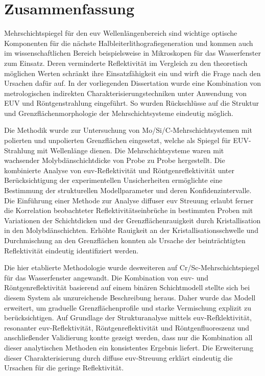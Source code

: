 \cleardoublepage

\thispagestyle{empty}

\section*{Zusammenfassung}

    Mehrschichtspiegel für den \gls{euv} Wellenlängenbereich sind wichtige optische Komponenten für die nächste Halbleiterlithografiegeneration und kommen auch im wissenschaftlichen Bereich beispielsweise in Mikroskopen für das Wasserfenster zum Einsatz. Deren verminderte Reflektivität im Vergleich zu den theoretisch möglichen Werten schränkt ihre Einsatzfähigkeit ein und wirft die Frage nach den Ursachen dafür auf. In der vorliegenden Dissertation wurde eine Kombination von metrologischen indirekten Charakterisierungstechniken unter Anwendung von EUV und Röntgenstrahlung eingeführt. So wurden Rückschlüsse auf die Struktur und Grenzflächenmorphologie der Mehrschichtsysteme eindeutig möglich.

    Die Methodik wurde zur Untersuchung von Mo/Si/C-Mehrschichtsystemen mit polierten und unpolierten Grenzflächen eingesetzt, welche als Spiegel für EUV-Strahlung mit  Wellenlänge dienen. Die Mehrschichtsysteme waren mit wachsender Molybdänschichtdicke von Probe zu Probe hergestellt. Die kombinierte Analyse von \gls{euv}-Reflektivität und Röntgenreflektivität unter Berücksichtigung der experimentellen Unsicherheiten ermöglichte eine Bestimmung der strukturellen Modellparameter und deren Konfidenzintervalle. Die Einführung einer Methode zur Analyse diffuser \gls{euv} Streuung erlaubt ferner die Korrelation beobachteter Reflektivitätseinbrüche in bestimmten Proben mit Variationen der Schichtdicken und der Grenzflächenrauigkeit durch Kristallisation in den Molybdänschichten. Erhöhte Rauigkeit an der Kristallisationsschwelle und Durchmischung an den Grenzflächen konnten als Ursache der beinträchtigten Reflektivität eindeutig identifiziert werden.

    Die hier etablierte Methodologie wurde desweiteren auf Cr/Sc-Mehrschichtspiegel für das Wasserfenster angewandt. Die Kombination von \gls{euv}- und Röntgenreflektivität basierend auf einem binären Schichtmodell stellte sich bei diesem System als unzureichende Beschreibung heraus. Daher wurde das Modell erweitert, um graduelle Grenzflächenprofile und starke Vermischung explizit zu berücksichtigen. Auf Grundlage der Strukturanalyse mittels \gls{euv}-Refklektivität, resonanter \gls{euv}-Reflektivität, Röntgenreflektivität und Röntgenfluoreszenz und anschließender Validierung kontte gezeigt werden, dass nur die Kombination all dieser analytischen Methoden ein konsistentes Ergebnis liefert. Die Erweiterung dieser Charakterisierung durch diffuse \gls{euv}-Streuung erklärt eindeutig die Ursachen für die geringe Reflektivität.

\cleardoublepage
